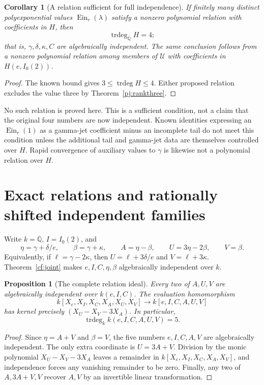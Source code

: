 \documentclass[11pt]{article}
\newtheorem{proposition}[theorem]{Proposition}
\newtheorem{corollary}[theorem]{Corollary}
\theoremstyle{definition}
\theoremstyle{remark}
\newcommand{\Qa}{\overline{\mathbb Q}}
\newcommand{\trdeg}{\operatorname{trdeg}}
\newcommand{\Ein}{\operatorname{Ein}}
\begin{document}
\begin{corollary}[A relation sufficient for full independence]
\label{pj:relationcriterion}
If finitely many distinct polyexponential values $\Ein_r(\lambda)$ satisfy
a nonzero polynomial relation with coefficients in $H$, then
\[
 \operatorname{trdeg}_{\overline{\mathbb Q}}H=4;
\]
that is, $\gamma,\delta,\kappa,C$ are algebraically independent.
The same conclusion follows from a nonzero polynomial relation among
members of $\mathcal U$ with coefficients in $H(e,I_0(2))$.
\end{corollary}
\begin{proof}
The known bound gives $3\le\operatorname{trdeg}H\le4$.
Either proposed relation excludes the value three by
Theorem~\ref{pj:rankthree}.
\end{proof}
No such relation is proved here. This is a sufficient condition,
not a claim that the original four numbers are now independent.
Known identities expressing an $\Ein_r(1)$ as a gamma-jet coefficient
minus an incomplete tail do not meet this condition unless the
additional tail and gamma-jet data are themselves controlled over
$H$. Rapid convergence of auxiliary values to $\gamma$ is likewise
not a polynomial relation over $H$.


\section{Exact relations and rationally shifted independent families}
\label{sec:auv-rational}

Write $k=\Qa$, $I=I_0(2)$, and
\[
 \eta=\gamma+\delta/e,\qquad \beta=\gamma+\kappa,\qquad
 A=\eta-\beta,\qquad U=3\eta-2\beta,\qquad V=\beta.
\]
Equivalently, if $\ell=\gamma-2\kappa$, then
$U=\ell+3\delta/e$ and $V=\ell+3\kappa$.
Theorem~\ref{cf:joint} makes $e,I,C,\eta,\beta$ algebraically independent over $k$.

\begin{proposition}[The complete relation ideal]\label{auv:ideal}
Every two of $A,U,V$ are algebraically independent over $k(e,I,C)$.
The evaluation homomorphism
\[
 k[X_e,X_I,X_C,X_A,X_U,X_V]\longrightarrow
 k[e,I,C,A,U,V]
\]
has kernel precisely $(X_U-X_V-3X_A)$.  In particular,
\[
 \trdeg_k k(e,I,C,A,U,V)=5.
\]
\end{proposition}
\begin{proof}
Since $\eta=A+V$ and $\beta=V$, the five numbers $e,I,C,A,V$ are
algebraically independent.  The only extra coordinate is $U=3A+V$.
Division by the monic polynomial $X_U-X_V-3X_A$ leaves a remainder
in $k[X_e,X_I,X_C,X_A,X_V]$, and independence forces any vanishing
remainder to be zero.  Finally, any two of
$A,3A+V,V$ recover $A,V$ by an invertible linear transformation.
\end{proof}
\end{document}
